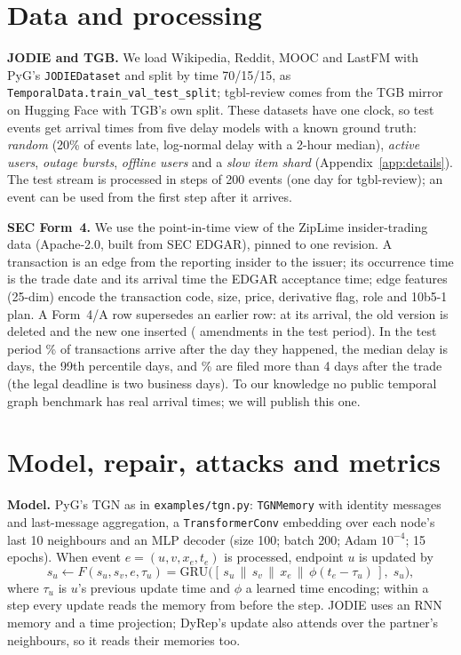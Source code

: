\documentclass{article}
\begin{document}
\section{Data and processing}
\label{sec:data}



\textbf{JODIE and TGB.} We load Wikipedia, Reddit, MOOC and LastFM with PyG's \texttt{JODIEDataset} and split by time
70/15/15, as \texttt{TemporalData.train\_val\_test\_split}; tgbl-review comes from the TGB mirror on Hugging Face with TGB's
own split. These datasets have one clock, so test events get arrival times from five delay models with a known ground
truth: \emph{random} (20\% of events late, log-normal delay with a 2-hour median), \emph{active users}, \emph{outage
bursts}, \emph{offline users} and a \emph{slow item shard} (Appendix~\ref{app:details}). The test stream is processed in
steps of 200 events (one day for tgbl-review); an event can be used from the first step after it arrives.

\textbf{SEC Form~4.} We use the point-in-time view of the ZipLime insider-trading data \citep{ziplime2026form4}
(Apache-2.0, built from SEC EDGAR), pinned to one revision. A transaction is an edge from the reporting insider to the
issuer; its occurrence time is the trade date and its arrival time the EDGAR acceptance time; edge features (25-dim)
encode the transaction code, size, price, derivative flag, role and 10b5-1 plan. A Form~4/A row supersedes an earlier row:
at its arrival, the old version is deleted and the new one inserted (\SecAmend{} amendments in the test period). In the test
period \SecLate\% of transactions arrive after the day they happened, the median delay is \SecLagMed{} days, the 99th
percentile \SecLagNinetyNine{} days, and \SecLagFour\% are filed more than 4 days after the trade (the legal deadline is two
business days). To our knowledge no public temporal graph benchmark has real arrival times; we will publish this one.

\section{Model, repair, attacks and metrics}
\label{sec:model}

\textbf{Model.} PyG's TGN \citep{rossi2020tgn} as in \texttt{examples/tgn.py}: \texttt{TGNMemory} with identity messages and
last-message aggregation, a \texttt{TransformerConv} embedding over each node's last 10 neighbours and an MLP decoder (size
100; batch 200; Adam $10^{-4}$; 15 epochs). When event $e=(u,v,x_e,t_e)$ is processed, endpoint $u$ is updated by
\begin{equation}
s_u \leftarrow F(s_u, s_v, e, \tau_u) = \mathrm{GRU}\big([\,s_u\,\|\,s_v\,\|\,x_e\,\|\,\phi(t_e-\tau_u)\,],\; s_u\big),
\label{eq:tgn}
\end{equation}
where $\tau_u$ is $u$'s previous update time and $\phi$ a learned time encoding; within a step every update reads the memory
from before the step. JODIE uses an RNN memory and a time projection; DyRep's update also attends over the partner's
neighbours, so it reads their memories too.
\end{document}
